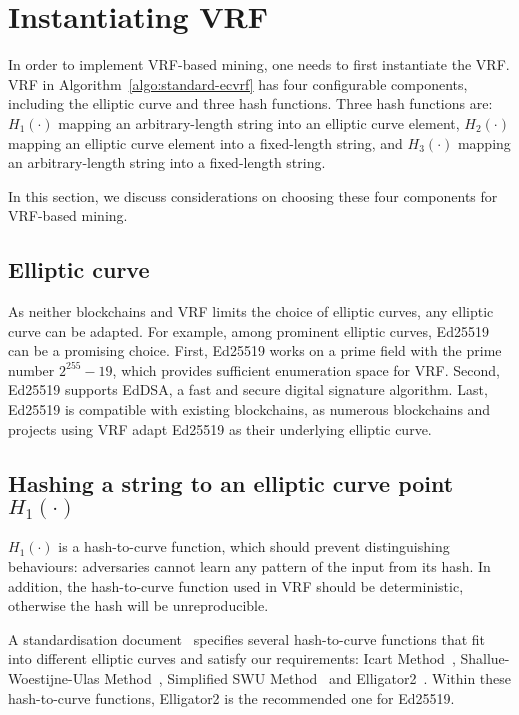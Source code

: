 \section{Instantiating VRF}
\label{sec:instantiation}

In order to implement VRF-based mining, one needs to first instantiate the VRF.
VRF in Algorithm~\ref{algo:standard-ecvrf} has four configurable components, including the elliptic curve and three hash functions.
Three hash functions are:
$H_{1}(\cdot)$ mapping an arbitrary-length string into an elliptic curve element,
$H_{2}(\cdot)$ mapping an elliptic curve element into a fixed-length string, and
$H_{3}(\cdot)$ mapping an arbitrary-length string into a fixed-length string.

In this section, we discuss considerations on choosing these four components for VRF-based mining.





\subsection{Elliptic curve}

As neither blockchains and VRF limits the choice of elliptic curves, any elliptic curve can be adapted.
For example, among prominent elliptic curves, Ed25519~\cite{bernstein2012high} can be a promising choice.
First, Ed25519 works on a prime field with the prime number $2^{255} - 19$, which provides sufficient enumeration space for VRF.
Second, Ed25519 supports EdDSA, a fast and secure digital signature algorithm.
Last, Ed25519 is compatible with existing blockchains, as numerous blockchains and projects using VRF adapt Ed25519 as their underlying elliptic curve.




\subsection{Hashing a string to an elliptic curve point $H_{1}(\cdot)$}

$H_{1}(\cdot)$ is a hash-to-curve function, which should prevent distinguishing behaviours: adversaries cannot learn any pattern of the input from its hash.
In addition, the hash-to-curve function used in VRF should be deterministic, otherwise the hash will be unreproducible.

A standardisation document~\cite{scott2019hashing} specifies several hash-to-curve functions that fit into different elliptic curves and satisfy our requirements: Icart Method~\cite{icart2009hash}, Shallue-Woestijne-Ulas Method~\cite{ulas2007rational}, Simplified SWU Method~\cite{brier2010efficient} and Elligator2~\cite{bernstein2013elligator}.
Within these hash-to-curve functions, Elligator2 is the recommended one for Ed25519.




